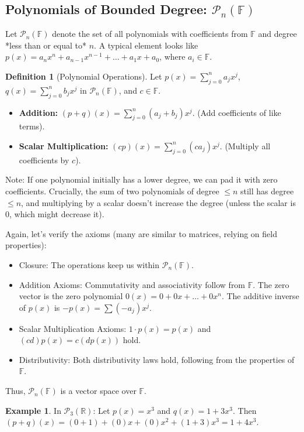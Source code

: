 \documentclass[11pt]{article}
\theoremstyle{definition}
\newtheorem{definition}[theorem]{Definition}
\newtheorem{example}[theorem]{Example}
\theoremstyle{remark}
\newcommand{\R}{\mathbb{R}}
\newcommand{\F}{\mathbb{F}} %
\newcommand{\PolyN}[2]{\mathcal{P}_{#1}(#2)}
\begin{document}
\subsection{Polynomials of Bounded Degree: $\PolyN{n}{\F}$}
Let $\PolyN{n}{\F}$ denote the set of all polynomials with coefficients from $\F$ and degree *less than or equal to* $n$. A typical element looks like $p(x) = a_n x^n + a_{n-1} x^{n-1} + \dots + a_1 x + a_0$, where $a_i \in \F$.

\begin{definition}[Polynomial Operations]
Let $p(x) = \sum_{j=0}^n a_j x^j$, $q(x) = \sum_{j=0}^n b_j x^j$ in $\PolyN{n}{\F}$, and $c \in \F$.
\begin{itemize}
    \item \textbf{Addition:} $(p+q)(x) = \sum_{j=0}^n (a_j + b_j) x^j$. (Add coefficients of like terms).
    \item \textbf{Scalar Multiplication:} $(c p)(x) = \sum_{j=0}^n (c a_j) x^j$. (Multiply all coefficients by $c$).
\end{itemize}
Note: If one polynomial initially has a lower degree, we can pad it with zero coefficients. Crucially, the sum of two polynomials of degree $\le n$ still has degree $\le n$, and multiplying by a scalar doesn't increase the degree (unless the scalar is 0, which might decrease it).
\end{definition}

Again, let's verify the axioms (many are similar to matrices, relying on field properties):
\begin{itemize}
    \item Closure: The operations keep us within $\PolyN{n}{\F}$.
    \item Addition Axioms: Commutativity and associativity follow from $\F$. The zero vector is the zero polynomial $0(x) = 0 + 0x + \dots + 0x^n$. The additive inverse of $p(x)$ is $-p(x) = \sum (-a_j)x^j$.
    \item Scalar Multiplication Axioms: $1 \cdot p(x) = p(x)$ and $(cd)p(x) = c(dp(x))$ hold.
    \item Distributivity: Both distributivity laws hold, following from the properties of $\F$.
\end{itemize}
Thus, $\PolyN{n}{\F}$ is a vector space over $\F$.

\begin{example}
In $\PolyN{3}{\R}$: Let $p(x) = x^3$ and $q(x) = 1 + 3x^3$.
Then $(p+q)(x) = (0+1) + (0)x + (0)x^2 + (1+3)x^3 = 1 + 4x^3$.
\end{example}
\end{document}
